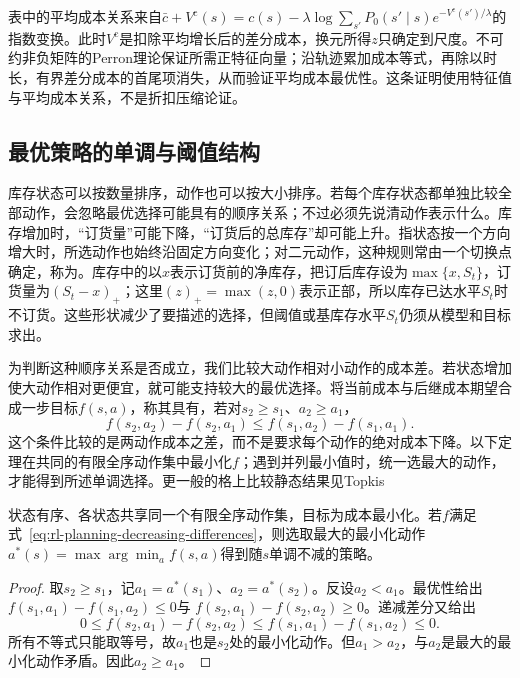 表中的平均成本关系来自$\bar c+V^{\mathrm c}(s)=c(s)-\lambda\log\sum_{s'}P_0(s'\mid s)e^{-V^{\mathrm c}(s')/\lambda}$的指数变换。此时$V^{\mathrm c}$是扣除平均增长后的差分成本，换元所得$z$只确定到尺度。不可约非负矩阵的Perron理论保证所需正特征向量；沿轨迹累加成本等式，再除以时长，有界差分成本的首尾项消失，从而验证平均成本最优性。这条证明使用特征值与平均成本关系，不是折扣压缩论证。

\subsection{最优策略的单调与阈值结构}
\label{sec:rl-planning-monotone}

库存状态可以按数量排序，动作也可以按大小排序。若每个库存状态都单独比较全部动作，会忽略最优选择可能具有的顺序关系；不过必须先说清动作表示什么。库存增加时，“订货量”可能下降，“订货后的总库存”却可能上升。指状态按一个方向增大时，所选动作也始终沿固定方向变化；对二元动作，这种规则常由一个切换点确定，称为。库存中的以$x$表示订货前的净库存，把订后库存设为$\max\{x,S_t\}$，订货量为$(S_t-x)_+$；这里$(z)_+=\max(z,0)$表示正部，所以库存已达水平$S_t$时不订货。这些形状减少了要描述的选择，但阈值或基库存水平$S_t$仍须从模型和目标求出。

为判断这种顺序关系是否成立，我们比较大动作相对小动作的成本差。若状态增加使大动作相对更便宜，就可能支持较大的最优选择。将当前成本与后继成本期望合成一步目标$f(s,a)$，称其具有，若对$s_2\geq s_1$、$a_2\geq a_1$，
\begin{equation}
 f(s_2,a_2)-f(s_2,a_1)
 \leq f(s_1,a_2)-f(s_1,a_1).
 \label{eq:rl-planning-decreasing-differences}
\end{equation}
这个条件比较的是两动作成本之差，而不是要求每个动作的绝对成本下降。以下定理在共同的有限全序动作集中最小化$f$；遇到并列最小值时，统一选最大的动作，才能得到所述单调选择。更一般的格上比较静态结果见Topkis

\begin{theorem}[递减差分给出单调最优动作]
 \label{thm:rl-planning-monotone}
 状态有序、各状态共享同一个有限全序动作集，目标为成本最小化。若$f$满足式~\eqref{eq:rl-planning-decreasing-differences}，则选取最大的最小化动作
 $a^*(s)=\max\arg\min_a f(s,a)$得到随$s$单调不减的策略。
\end{theorem}
\begin{proof}
 取$s_2\geq s_1$，记$a_1=a^*(s_1)$、$a_2=a^*(s_2)$。反设$a_2<a_1$。最优性给出
 $f(s_1,a_1)-f(s_1,a_2)\leq0$与
 $f(s_2,a_1)-f(s_2,a_2)\geq0$。递减差分又给出
 \[
 0\leq f(s_2,a_1)-f(s_2,a_2)
 \leq f(s_1,a_1)-f(s_1,a_2)\leq0.
 \]
 所有不等式只能取等号，故$a_1$也是$s_2$处的最小化动作。但$a_1>a_2$，与$a_2$是最大的最小化动作矛盾。因此$a_2\geq a_1$。
\end{proof}

